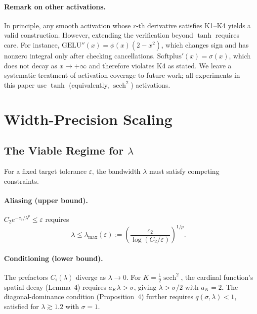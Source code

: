 \documentclass{article}
\begin{document}
\paragraph{Remark on other activations.}
In principle, any smooth activation whose \(r\)-th derivative satisfies K1--K4 yields a valid construction. However, extending the verification beyond \(\tanh\) requires care. For instance, \(\mathrm{GELU}''(x) = \phi(x)(2 - x^2)\), which changes sign and has nonzero integral only after checking cancellations. \(\mathrm{Softplus}'(x) = \sigma(x)\), which does not decay as \(x \to +\infty\) and therefore violates K4 as stated. We leave a systematic treatment of activation coverage to future work; all experiments in this paper use \(\tanh\) (equivalently, \(\operatorname{sech}^2\)) activations.

\section{Width-Precision Scaling}
\label{app:width-precision}

\subsection{The Viable Regime for \(\lambda\)}
\label{app:viable-lambda}

For a fixed target tolerance \(\varepsilon\), the bandwidth \(\lambda\) must satisfy competing constraints.

\paragraph{Aliasing (upper bound).}
\(C_2 e^{-c_2/\lambda^p} \leq \varepsilon\) requires
\[
\lambda \leq \lambda_{\max}(\varepsilon)
:=
\left(\frac{c_2}{\log(C_2/\varepsilon)}\right)^{1/p}.
\]

\paragraph{Conditioning (lower bound).}
The prefactors \(C_i(\lambda)\) diverge as \(\lambda \to 0\). For \(K = \tfrac{1}{2}\operatorname{sech}^2\), the cardinal function's spatial decay (Lemma~4) requires \(a_K \lambda > \sigma\), giving \(\lambda > \sigma/2\) with \(a_K = 2\). The diagonal-dominance condition (Proposition~4) further requires \(q(\sigma,\lambda) < 1\), satisfied for \(\lambda \gtrsim 1.2\) with \(\sigma = 1\).
\end{document}
